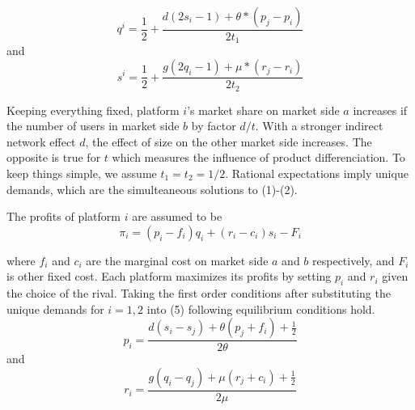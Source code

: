\documentclass[10pt,a4paper]{article}
\begin{document}
\begin{equation}
 q^i=\frac{1}{2}+\frac{d(2s_i-1)+\theta*(p_j-p_i)}{2t_1}
\end{equation} and \begin{equation}
s^i=\frac{1}{2}+\frac{g(2q_i-1)+\mu*(r_j-r_i)}{2t_2} \end{equation} 

Keeping everything fixed, platform $i$'s market share on market side $a$ increases if the number of users in market side $b$ by factor $d/t$. With a stronger indirect network effect $d$, the effect of size on the other market side increases. The opposite is true for $t$ which measures the influence of product differenciation. To keep things simple, we assume $t_1=t_2=1/2$. Rational expectations imply unique demands, which are the simulteaneous solutions to (1)-(2). 

The profits of platform $i$ are assumed to be
\begin{equation}
\pi_i=(p_i-f_i)q_i+(r_i-c_i)s_i-F_i
\end{equation}

where $f_i$ and $c_i$ are the marginal cost on market side $a$ and $b$ respectively, and $F_i$ is other fixed cost. Each platform maximizes its profits by setting $p_i$ and $r_i$ given the choice of the rival. 
Taking the first order conditions after substituting the unique demands for $i=1,2$ into (5) following equilibrium conditions hold. 
\begin{equation}
p_i=\frac{d(s_i-s_j)+\theta(p_j+f_i)+\frac{1}{2}}{2\theta}
\end{equation} and 
\begin{equation}
r_i=\frac{g(q_i-q_j)+\mu(r_j+c_i)+\frac{1}{2}}{2\mu}
\end{equation}
\end{document}
